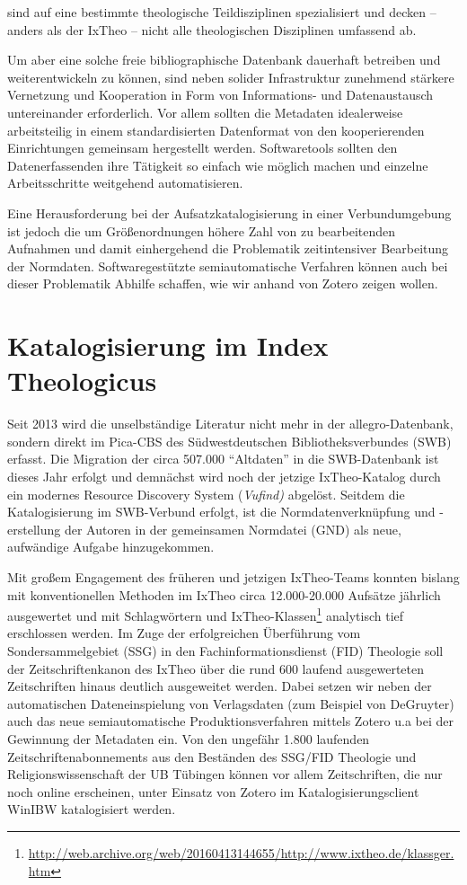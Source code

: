 \documentclass[a4paper,
fontsize=11pt,
oneside,
numbers=noperiodatend,
parskip=half-,
bibliography=totoc,
final
]{scrartcl}
\begin{document}
sind auf eine bestimmte theologische Teildisziplinen spezialisiert und
decken -- anders als der IxTheo -- nicht alle theologischen Disziplinen
umfassend ab.

Um aber eine solche freie bibliographische Datenbank dauerhaft betreiben
und weiterentwickeln zu können, sind neben solider Infrastruktur
zunehmend stärkere Vernetzung und Kooperation in Form von Informations-
und Datenaustausch untereinander erforderlich. Vor allem sollten die
Metadaten idealerweise arbeitsteilig in einem standardisierten
Datenformat von den kooperierenden Einrichtungen gemeinsam hergestellt
werden. Softwaretools sollten den Datenerfassenden ihre Tätigkeit so
einfach wie möglich machen und einzelne Arbeitsschritte weitgehend
automatisieren.

Eine Herausforderung bei der Aufsatzkatalogisierung in einer
Verbundumgebung ist jedoch die um Größenordnungen höhere Zahl von zu
bearbeitenden Aufnahmen und damit einhergehend die Problematik
zeitintensiver Bearbeitung der Normdaten. Softwaregestützte
semiautomatische Verfahren können auch bei dieser Problematik Abhilfe
schaffen, wie wir anhand von Zotero zeigen wollen.

\section*{Katalogisierung im Index
Theologicus}\label{katalogisierung-im-index-theologicus}

Seit 2013 wird die unselbständige Literatur nicht mehr in der
allegro-Datenbank, sondern direkt im Pica-CBS des Südwestdeutschen
Bibliotheksverbundes (SWB) erfasst. Die Migration der circa 507.000
\enquote{Altdaten} in die SWB-Datenbank ist dieses Jahr erfolgt und
demnächst wird noch der jetzige IxTheo-Katalog durch ein modernes
Resource Discovery System (\emph{Vufind)} abgelöst. Seitdem die
Katalogisierung im SWB-Verbund erfolgt, ist die Normdatenverknüpfung und
-erstellung der Autoren in der gemeinsamen Normdatei (GND) als neue,
aufwändige Aufgabe hinzugekommen.

Mit großem Engagement des früheren und jetzigen IxTheo-Teams konnten
bislang mit konventionellen Methoden im IxTheo circa 12.000-20.000
Aufsätze jährlich ausgewertet und mit Schlagwörtern und
IxTheo-Klassen\footnote{\url{http://web.archive.org/web/20160413144655/http://www.ixtheo.de/klassger.htm}}
analytisch tief erschlossen werden. Im Zuge der erfolgreichen
Überführung vom Sondersammelgebiet (SSG) in den Fachinformationsdienst
(FID) Theologie soll der Zeitschriftenkanon des IxTheo über die rund 600
laufend ausgewerteten Zeitschriften hinaus deutlich ausgeweitet werden.
Dabei setzen wir neben der automatischen Dateneinspielung von
Verlagsdaten (zum Beispiel von DeGruyter) auch das neue semiautomatische
Produktionsverfahren mittels Zotero u.a bei der Gewinnung der Metadaten
ein. Von den ungefähr 1.800 laufenden Zeitschriftenabonnements aus den
Beständen des SSG/FID Theologie und Religionswissenschaft der UB
Tübingen können vor allem Zeitschriften, die nur noch online erscheinen,
unter Einsatz von Zotero im Katalogisierungsclient WinIBW katalogisiert
werden.
\end{document}
